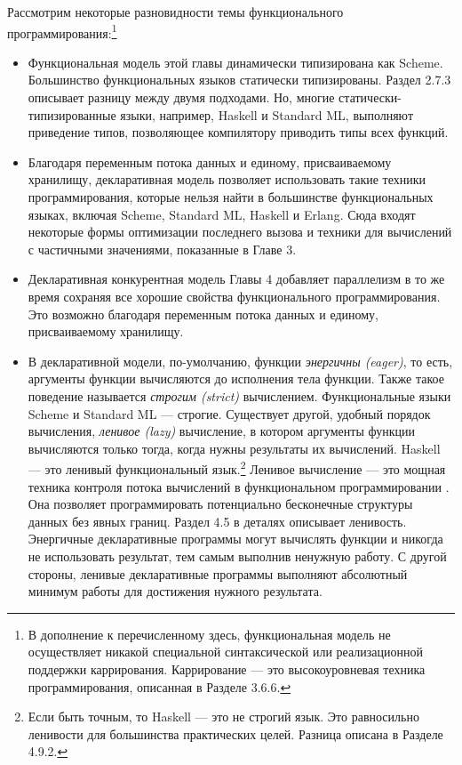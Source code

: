 Рассмотрим некоторые разновидности темы функционального программирования:\footnote{В дополнение к перечисленному здесь, функциональная модель не осуществляет никакой специальной синтаксической или реализационной поддержки каррирования. Каррирование --- это высокоуровневая техника программирования, описанная в Разделе 3.6.6.}

\begin{itemize}
\item{Функциональная модель этой главы динамически типизирована как Scheme. Большинство функциональных языков статически типизированы. Раздел 2.7.3 описывает разницу между двумя подходами. Но, многие статически-типизированные языки, например, Haskell и Standard ML, выполняют приведение типов, позволяющее компилятору приводить типы всех функций.}

\item{Благодаря переменным потока данных и единому, присваиваемому хранилищу, декларативная модель позволяет использовать такие техники программирования, которые нельзя найти в большинстве функциональных языках, включая Scheme, Standard ML, Haskell и Erlang. Сюда входят некоторые формы оптимизации последнего вызова и техники для вычислений с частичными значениями, показанные в Главе 3.}

\item{Декларативная конкурентная модель Главы 4 добавляет параллелизм в то же время сохраняя все хорошие свойства функционального программирования. Это возможно благодаря переменным потока данных и единому, присваиваемому хранилищу.}

\item{В декларативной модели, по-умолчанию, функции \emph{энергичны ({eager})}, то есть, аргументы функции вычисляются до исполнения тела функции. Также такое поведение называется \emph{строгим ({strict})} вычислением. Функциональные языки Scheme и Standard ML --- строгие. Существует другой, удобный порядок вычисления, \emph{ленивое (lazy)} вычисление, в котором аргументы функции вычисляются только тогда, когда нужны результаты их вычислений. Haskell --- это ленивый функциональный язык.\footnote{Если быть точным, то Haskell --- это не строгий язык. Это равносильно ленивости для большинства практических целей. Разница описана в Разделе 4.9.2.} Ленивое вычисление --- это мощная техника контроля потока вычислений в функциональном программировании \cite{87}. Она позволяет программировать потенциально бесконечные структуры данных без явных границ. Раздел 4.5 в деталях описывает ленивость. Энергичные декларативные программы могут вычислять функции и никогда не использовать результат, тем самым выполнив ненужную работу. С другой стороны, ленивые декларативные программы выполняют абсолютный минимум работы для достижения нужного результата.}

\end{itemize}



